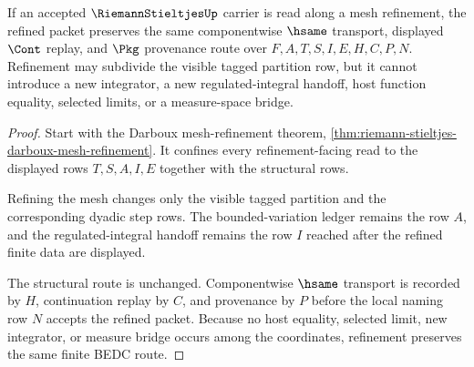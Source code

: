 \begin{theorem}
\label{thm:riemann-stieltjes-mesh-refinement-stability}
If an accepted $\RiemannStieltjesUp$ carrier is read along a mesh refinement, the refined packet preserves the same componentwise $\hsame$ transport, displayed $\Cont$ replay, and $\Pkg$ provenance route over $F,A,T,S,I,E,H,C,P,N$. Refinement may subdivide the visible tagged partition row, but it cannot introduce a new integrator, a new regulated-integral handoff, host function equality, selected limits, or a measure-space bridge.
\end{theorem}
\begin{proof}
Start with the Darboux mesh-refinement theorem, \autoref{thm:riemann-stieltjes-darboux-mesh-refinement}. It confines every refinement-facing read to the displayed rows $T,S,A,I,E$ together with the structural rows.

Refining the mesh changes only the visible tagged partition and the corresponding dyadic step rows. The bounded-variation ledger remains the row $A$, and the regulated-integral handoff remains the row $I$ reached after the refined finite data are displayed.

The structural route is unchanged. Componentwise $\hsame$ transport is recorded by $H$, continuation replay by $C$, and provenance by $P$ before the local naming row $N$ accepts the refined packet. Because no host equality, selected limit, new integrator, or measure bridge occurs among the coordinates, refinement preserves the same finite BEDC route.
\end{proof}

